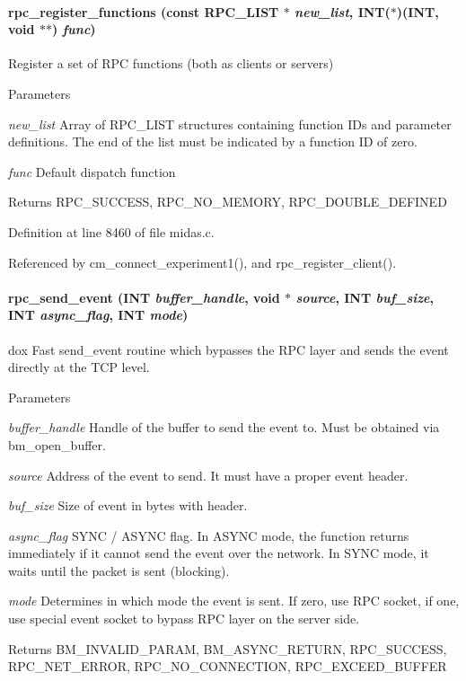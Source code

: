 \paragraph[{rpc\_\-register\_\-functions}]{ rpc\_\-register\_\-functions (const RPC\_\-LIST $\ast$ {\em new\_\-list}, \/  {\bf INT}($\ast$)({\bf INT}, void $\ast$$\ast$) {\em func})}\hfill\label{group__rpcfunctionc_ga8503759d27477f8dd4558864dde5a687}
Register a set of RPC functions (both as clients or servers) 
\begin{DoxyParams}{Parameters}
\item[{\em new\_\-list}]Array of RPC\_\-LIST structures containing function IDs and parameter definitions. The end of the list must be indicated by a function ID of zero. \item[{\em func}]Default dispatch function\end{DoxyParams}
\begin{DoxyReturn}{Returns}
RPC\_\-SUCCESS, RPC\_\-NO\_\-MEMORY, RPC\_\-DOUBLE\_\-DEFINED 
\end{DoxyReturn}


Definition at line 8460 of file midas.c.

Referenced by cm\_\-connect\_\-experiment1(), and rpc\_\-register\_\-client().
\paragraph[{rpc\_\-send\_\-event}]{ rpc\_\-send\_\-event ({\bf INT} {\em buffer\_\-handle}, \/  void $\ast$ {\em source}, \/  {\bf INT} {\em buf\_\-size}, \/  {\bf INT} {\em async\_\-flag}, \/  {\bf INT} {\em mode})}\hfill\label{group__rpcfunctionc_ga3191feb350dfa7289e8c7cf2f5993222}
dox Fast send\_\-event routine which bypasses the RPC layer and sends the event directly at the TCP level. 
\begin{DoxyParams}{Parameters}
\item[{\em buffer\_\-handle}]Handle of the buffer to send the event to. Must be obtained via bm\_\-open\_\-buffer. \item[{\em source}]Address of the event to send. It must have a proper event header. \item[{\em buf\_\-size}]Size of event in bytes with header. \item[{\em async\_\-flag}]SYNC / ASYNC flag. In ASYNC mode, the function returns immediately if it cannot send the event over the network. In SYNC mode, it waits until the packet is sent (blocking). \item[{\em mode}]Determines in which mode the event is sent. If zero, use RPC socket, if one, use special event socket to bypass RPC layer on the server side.\end{DoxyParams}
\begin{DoxyReturn}{Returns}
BM\_\-INVALID\_\-PARAM, BM\_\-ASYNC\_\-RETURN, RPC\_\-SUCCESS, RPC\_\-NET\_\-ERROR, RPC\_\-NO\_\-CONNECTION, RPC\_\-EXCEED\_\-BUFFER 
\end{DoxyReturn}


